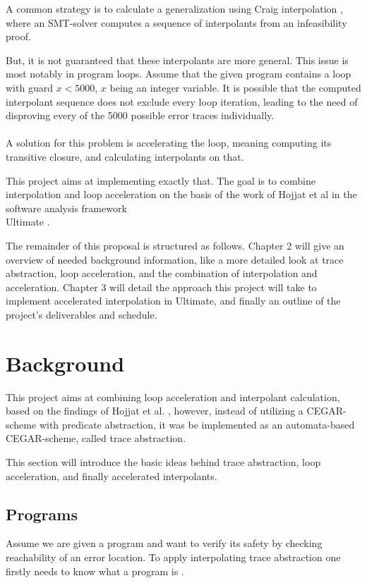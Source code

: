 \documentclass{article}
\begin{document}
A common strategy is \cite{10.1007/978-3-642-03237-0_7} to calculate a generalization using Craig interpolation \cite{craig_1957}, where an SMT-solver computes a sequence of interpolants from an infeasibility proof. \par 
But, it is not guaranteed that these interpolants are more general. This issue is most notably in program loops. Assume that the given program contains a loop with guard $x < 5000$, $x$ being an integer variable. It is possible that the computed interpolant sequence does not exclude every loop iteration, leading to the need of disproving every of the 5000 possible error traces individually. \\ \\
A solution for this problem is accelerating the loop, meaning computing its transitive closure, and calculating interpolants on that. \par This project aims at implementing exactly that. 
The goal is to combine interpolation and loop acceleration on the basis of the work of Hojjat et al \cite{10.1007/978-3-642-33386-6_16} in the software analysis framework \\ Ultimate \cite{Zitat02}. \par
The remainder of this proposal is structured as follows. Chapter 2 will give an overview of needed background information, like a more detailed look at trace abstraction, loop acceleration, and the combination of interpolation and acceleration. Chapter 3 will detail the approach this project will take to implement accelerated interpolation in Ultimate, and finally an outline of the project's deliverables and schedule.

\section{Background}
This project aims at combining loop acceleration and interpolant calculation, based on the findings of Hojjat et al. \cite{10.1007/978-3-642-33386-6_16}, however, instead of utilizing a CEGAR-scheme with predicate abstraction, it was be implemented as an automata-based CEGAR-scheme, called trace abstraction. \par
This section will introduce the basic ideas behind trace abstraction, loop acceleration, and finally accelerated interpolants.

\subsection{Programs}
Assume we are given a program and want to verify its safety by checking reachability of an error location. 
To apply interpolating trace abstraction one firstly needs to know what a program is \cite{DBLP:journals/corr/GreitschusDP17}. \\ 
\end{document}
